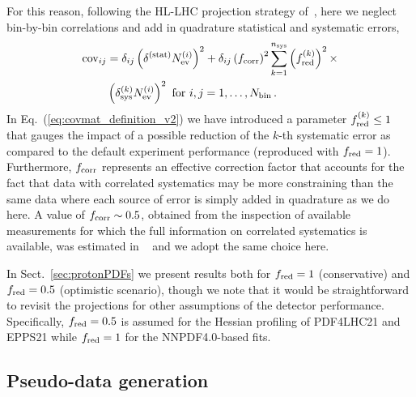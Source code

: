 For this reason, following the HL-LHC projection strategy of~\cite{AbdulKhalek:2018rok},
here we neglect bin-by-bin correlations
and add in quadrature statistical and systematic errors,
\begin{align}
	\label{eq:covmat_definition_v2}
	{\rm cov}_{ij} &= \delta_{ij} \left( \delta^{\rm (stat)}  N_{\rm ev}^{(i)}\right)^2
	+ \delta_{ij}\left( f_{\rm corr}\right)^2\sum_{k=1}^{n_{\rm sys}} \left( f_{\rm red}^{(k)}\right)^2 \times
	\nonumber \\
	& \left( \delta_{\rm sys}^{(k)} N_{\rm ev}^{(i)} \right)^2 \text{ for } i,j=1,\ldots,N_{\rm bin} \, .
\end{align}
In Eq.~(\ref{eq:covmat_definition_v2}) we have introduced a parameter $f_{\rm red}^{(k)}\le 1$
that gauges the impact of a possible reduction of the $k$-th systematic error
as compared to the default experiment performance (reproduced with $f_{\rm red}=1$).
%
Furthermore, $f_{\rm corr}$ represents an effective correction factor that accounts for the fact that data with correlated
systematics may be more constraining than the same data where each source of error is simply
added in quadrature as we do here.
%
A value of $f_{\rm corr} \sim 0.5$, obtained from the inspection of available measurements
 for which the full information
 on correlated systematics is available, was estimated in ~\cite{AbdulKhalek:2018rok}
 and we adopt the same choice here.

 In  Sect.~\ref{sec:protonPDFs} we present results both for $f_{\rm red}=1$ (conservative)
 and $f_{\rm red}=0.5$ (optimistic scenario), though we note that it would be straightforward to revisit
 the projections for other assumptions of the detector performance.
 Specifically, $f_{\rm red}=0.5$ is assumed for the Hessian profiling
 of PDF4LHC21 and EPPS21 while $f_{\rm red}=1$ for the NNPDF4.0-based fits.

 \subsection{Pseudo-data generation}

